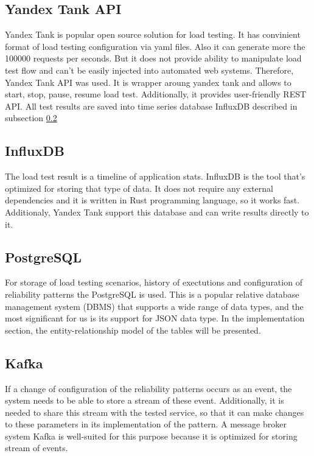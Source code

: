\subsection{Yandex Tank API}\label{subsec:ya-api}
Yandex Tank is popular open source solution for load testing. It has convinient format of load testing configuration via yaml files. Also it can generate more the 100000 requests per seconds. But it does not provide ability to manipulate load test flow and can't be easily injected into automated web systems. Therefore, Yandex Tank API was used. It is wrapper aroung yandex tank and allows to start, stop, pause, resume load test. Additionally, it provides user-friendly REST API. All test results are saved into time series database InfluxDB described in subsection \ref{subsec:influx}

\subsection{InfluxDB}\label{subsec:influx}
The load test result is a timeline of application stats. InfluxDB is the tool that's optimized for storing that type of data. It does not require any external dependencies and it is written in Rust programming language, so it works fast. Additionaly, Yandex Tank support this database and can write results directly to it.

\subsection{PostgreSQL}\label{subsec:postgre}
For storage of load testing scenarios, history of exectutions and configuration of reliability patterns the PostgreSQL is used. This is a popular relative database management system (DBMS) that supports a wide range of data types, and the most significant for us is its support for JSON data type. In the implementation section, the entity-relationship model of the tables will be presented.

\subsection{Kafka}\label{subsec:kafka}
If a change of configuration of the reliability patterns occurs as an event, the system needs to be able to store a stream of these event. Additionally, it is needed to share this stream with the tested service, so that it can make changes to these parameters in its implementation of the pattern. A message broker system Kafka is well-suited for this purpose because it is optimized for storing stream of events.

